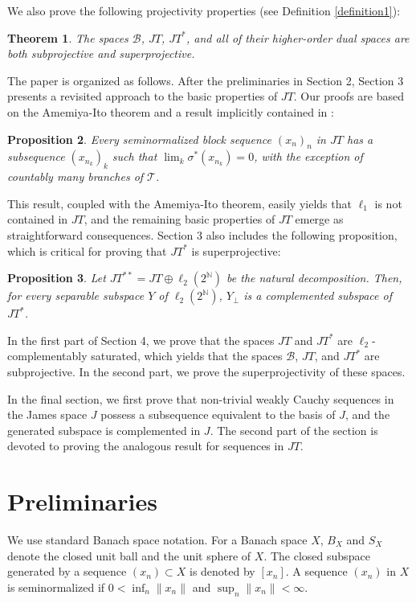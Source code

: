 \documentclass[12pt]{amsart}
\theoremstyle{plain}
\numberwithin{equation}{section}
\newcommand{\N}{\mathbb{N}}
\newcommand{\s}{\sigma}
\newcommand{\Tree}{\mathcal{T}}
\newtheorem{theorem}{Theorem}[section]
\newtheorem{proposition}[theorem]{Proposition}
\begin{document}
We also prove the following projectivity properties (see Definition \ref{definition1}):

\begin{theorem}
The spaces $\mathcal{B}$, $JT$, $JT^*$, and all of their higher-order dual spaces are both subprojective and superprojective.
\end{theorem}

The paper is organized as follows. After the preliminaries in Section 2, Section 3 presents a revisited approach to the basic properties of $JT$. Our proofs are based on the Amemiya-Ito theorem and a result implicitly contained in \cite{LS}:

\begin{proposition}
Every seminormalized block sequence $(x_n)_n$ in $JT$ has a subsequence $(x_{n_k})_k$ such that $\lim_k \s^*(x_{n_k}) = 0$, with the exception of countably many branches of $\Tree$.
\end{proposition}

This result, coupled with the Amemiya-Ito theorem, easily yields that $\ell_1$ is not contained in $JT$, and the remaining basic properties of $JT$ emerge as straightforward consequences. Section 3 also includes the following proposition, which is critical for proving that $JT^*$ is superprojective:

\begin{proposition}
Let $JT^{**} = JT \oplus \ell_2(2^\N)$ be the natural decomposition. Then, for every separable subspace $Y$ of $\ell_2(2^\N)$, $Y_\perp$ is a complemented subspace of $JT^*$.
\end{proposition}

In the first part of Section 4, we prove that the spaces $JT$ and $JT^*$ are $\ell_2$-complement\-ably saturated, which yields that the spaces $\mathcal{B}$, $JT$, and $JT^*$ are subprojective. In the second part, we prove the superprojectivity of these spaces.

In the final section, we first prove that non-trivial weakly Cauchy sequences in the James space $J$ possess a subsequence equivalent to the basis of $J$, and the generated subspace is complemented in $J$. The second part of the section is devoted to proving the analogous result for sequences in $JT$.

\section{Preliminaries}

We use standard Banach space notation. For a Banach space $X$, $B_X$ and $S_X$ denote the closed unit ball and the unit sphere of $X$. The closed subspace generated by a sequence $(x_n)\subset X$ is denoted by $[x_n]$. A sequence $(x_n)$ in $X$ is seminormalized if $0<\inf_n \|x_n\|$ and $\sup_n\|x_n\|<\infty$.
\end{document}
